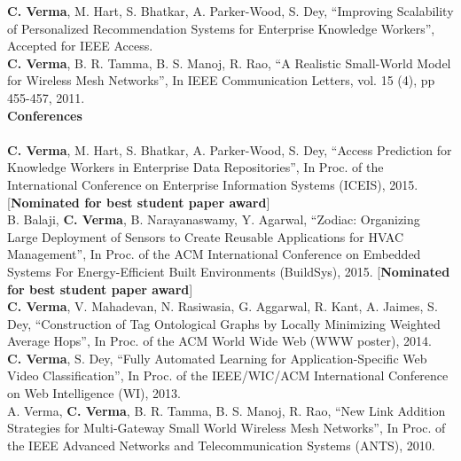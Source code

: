 \documentclass[12pt]{ucsddissertation}
\newcommand{\comment}[1]{}
\begin{document}
\begin{vita}
{\noindent \textbf{C. Verma}, M. Hart, S. Bhatkar, A. Parker-Wood, S. Dey, ``Improving Scalability of Personalized Recommendation Systems for Enterprise Knowledge Workers'', Accepted for IEEE Access. \\

\noindent \textbf{C. Verma}, B. R. Tamma, B. S. Manoj, R. Rao, ``A Realistic Small-World Model for Wireless Mesh Networks'', In IEEE Communication Letters, vol. 15 (4), pp 455-457, 2011. \\

\noindent\textbf{Conferences} \\ \\
\noindent \textbf{C. Verma}, M. Hart, S. Bhatkar, A. Parker-Wood, S. Dey, ``Access Prediction for Knowledge Workers in Enterprise Data Repositories'', In Proc. of the International Conference on Enterprise Information Systems (ICEIS), 2015. [\textbf{Nominated for best student paper award}] \\

\noindent B. Balaji, \textbf{C. Verma}, B. Narayanaswamy, Y. Agarwal, ``Zodiac: Organizing Large Deployment of Sensors to Create Reusable Applications for HVAC Management'', In Proc. of the ACM International Conference on Embedded Systems For Energy-Efficient Built Environments (BuildSys), 2015.  [\textbf{Nominated for best student paper award}]\\

\noindent \textbf{C. Verma}, V. Mahadevan, N. Rasiwasia, G. Aggarwal, R. Kant, A. Jaimes, S. Dey, ``Construction of Tag Ontological Graphs by Locally Minimizing Weighted Average Hops'', In Proc. of the ACM World Wide Web (WWW poster), 2014. \\ 


\noindent \textbf{C. Verma}, S. Dey, ``Fully Automated Learning for Application-Specific Web Video Classification'', In Proc. of the IEEE/WIC/ACM International Conference on Web Intelligence (WI), 2013. \\ 

\noindent A. Verma, \textbf{C. Verma}, B. R. Tamma, B. S. Manoj, R. Rao, ``New Link Addition Strategies for Multi-Gateway Small World Wireless Mesh Networks'', In Proc. of the IEEE Advanced Networks and  Telecommunication Systems (ANTS), 2010. 

}

\comment{

\fieldsofstudy
\noindent Major Field: Engineering (Specialization or Focused Studies)
\vskip\baselineskip
Studies in Applied Mathematics\par
Professors Alpha Beta and Gamma Delta
\vskip\baselineskip
Studies in Mechanices\par
Professors Epsilon Zeta and Eta Theta
\vskip\baselineskip
Studies in Electromagnetism\par
Professors Iota Kappa and Lambda Mu

}
\end{vita}
\end{document}
